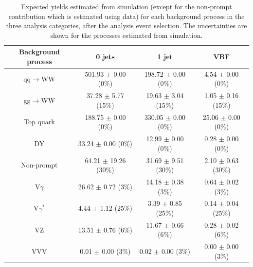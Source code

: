 \begin{table}[h!]\begin{center}
\caption{Expected yields estimated from simulation (except for the non-prompt contribution which is estimated using data) for each background process in the three analysis categories, after the analysis event selection. The uncertainties are shown for the processes estimated from simulation.}\label{tab:bkg_yields}
\small{\begin{tabular}{c c c c }
\toprule
             Background process           &         0 jets                                          &          1 jet                                         &        VBF                                           \\
\midrule
      qq$\to$WW                &    501.93 $\pm$       0.00 (0\%)              &     198.72 $\pm$       0.00 (0\%)             &      4.54 $\pm$       0.00 (0\%)               \\
      gg$\to$WW                &     37.28 $\pm$       5.77 (15\%)              &      19.63 $\pm$       3.04 (15\%)             &      1.05 $\pm$       0.16 (15\%)               \\
      Top quark                &    188.75 $\pm$       0.00 (0\%)              &     330.05 $\pm$       0.00 (0\%)             &     25.06 $\pm$       0.00 (0\%)               \\
      DY                &     33.24 $\pm$       0.00 (0\%)              &      12.99 $\pm$       0.00 (0\%)             &      0.28 $\pm$       0.00 (0\%)               \\
      Non-prompt                &     64.21 $\pm$      19.26 (30\%)              &      31.69 $\pm$       9.51 (30\%)             &      2.10 $\pm$       0.63 (30\%)               \\
      V$\gamma$                &     26.62 $\pm$       0.72  (3\%)              &      14.18 $\pm$       0.38  (3\%)             &      0.64 $\pm$       0.02 (3\%)               \\
     V$\gamma^*$                &      4.44 $\pm$       1.12 (25\%)              &       3.39 $\pm$       0.85 (25\%)             &      0.14 $\pm$       0.04 (25\%)               \\
     VZ                &     13.51 $\pm$       0.76  (6\%)              &      11.67 $\pm$       0.66 (6\%)             &      0.28 $\pm$       0.02 (6\%)               \\
     VVV                &      0.01 $\pm$       0.00 (3\%)              &       0.02 $\pm$       0.00 (3\%)             &      0.00 $\pm$       0.00 (3\%)               \\   
     

\end{tabular}}
\end{center}
\end{table}
